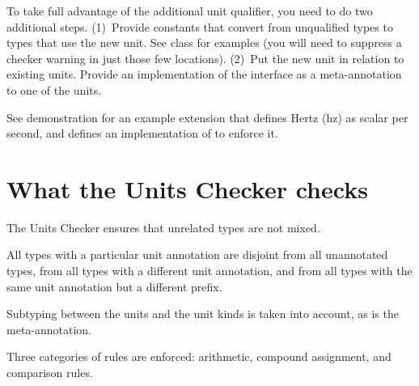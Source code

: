 To take full advantage of the additional unit qualifier, you need to
do two additional steps.
(1)~Provide constants that convert from unqualified types to types that use
the new unit.
See class  for examples (you will need to suppress a
checker warning in just those few locations).
(2)~Put the new unit in relation to existing units.
Provide an
implementation of the  interface as a
meta-annotation to one of the units.

See demonstration  for an example
extension that defines Hertz (hz) as scalar per second, and defines an
implementation of  to enforce it.



\section{What the Units Checker checks\label{units-checks}}



The Units Checker ensures that unrelated types are not mixed.

All types with a particular unit annotation are
disjoint from all unannotated types, from all types with a different unit
annotation, and from all types with the same unit annotation but a
different prefix.

Subtyping between the units and the unit kinds is taken into account,
as is the  meta-annotation.

Three categories of rules are enforced: arithmetic, compound assignment,
and comparison rules.

